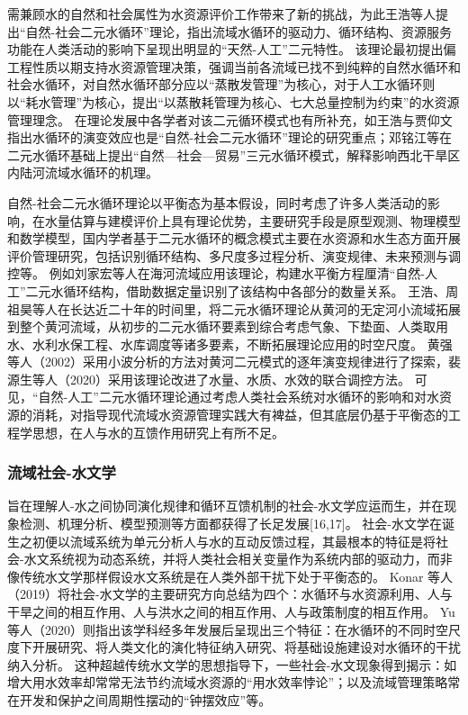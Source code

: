 需兼顾水的自然和社会属性为水资源评价工作带来了新的挑战，为此王浩等人提出“自然-社会二元水循环”理论，指出流域水循环的驱动力、循环结构、资源服务功能在人类活动的影响下呈现出明显的“天然-人工”二元特性\cite{wang2006}。
该理论最初提出偏工程性质以期支持水资源管理决策，强调当前各流域已找不到纯粹的自然水循环和社会水循环，对自然水循环部分应以“蒸散发管理”为核心，对于人工水循环则以“耗水管理”为核心，提出“以蒸散耗管理为核心、七大总量控制为约束”的水资源管理理念\cite{wang2010}。
在理论发展中各学者对该二元循环模式也有所补充，如王浩与贾仰文指出水循环的演变效应也是“自然-社会二元水循环”理论的研究重点\cite{wang2016}；邓铭江等在二元水循环基础上提出“自然—社会—贸易”三元水循环模式，解释影响西北干旱区内陆河流域水循环的机理\cite{deng2020}。

% 
自然-社会二元水循环理论以平衡态为基本假设，同时考虑了许多人类活动的影响，在水量估算与建模评价上具有理论优势，主要研究手段是原型观测、物理模型和数学模型，国内学者基于二元水循环的概念模式主要在水资源和水生态方面开展评价管理研究，包括识别循环结构、多尺度多过程分析、演变规律、未来预测与调控等\cite{wang2016}。
例如刘家宏等人在海河流域应用该理论，构建水平衡方程厘清“自然-人工”二元水循环结构，借助数据定量识别了该结构中各部分的数量关系\cite{liu2010}。
王浩\cite{wang2004}、周祖昊\cite{zhou2022a}等人在长达近二十年的时间里，将二元水循环理论从黄河的无定河小流域拓展到整个黄河流域，从初步的二元水循环要素到综合考虑气象、下垫面、人类取用水、水利水保工程、水库调度等诸多要素，不断拓展理论应用的时空尺度。
黄强等人（2002）采用小波分析的方法对黄河二元模式的逐年演变规律进行了探索\cite{huang2002}，裴源生等人（2020）采用该理论改进了水量、水质、水效的联合调控方法\cite{pei2020}。
可见，“自然-人工”二元水循环理论通过考虑人类社会系统对水循环的影响和对水资源的消耗，对指导现代流域水资源管理实践大有裨益，但其底层仍基于平衡态的工程学思想，在人与水的互馈作用研究上有所不足。

\subsubsection*{流域社会-水文学}

旨在理解人-水之间协同演化规律和循环互馈机制的社会-水文学应运而生，并在现象检测、机理分析、模型预测等方面都获得了长足发展[16,17]。
社会-水文学在诞生之初便以流域系统为单元分析人与水的互动反馈过程，其最根本的特征是将社会-水文系统视为动态系统，并将人类社会相关变量作为系统内部的驱动力，而非像传统水文学那样假设水文系统是在人类外部干扰下处于平衡态的\cite{sivapalan2012}。
Konar 等人（2019）将社会-水文学的主要研究方向总结为四个：水循环与水资源利用、人与干旱之间的相互作用、人与洪水之间的相互作用、人与政策制度的相互作用\cite{konar2019}。
Yu 等人（2020）则指出该学科经多年发展后呈现出三个特征：在水循环的不同时空尺度下开展研究、将人类文化的演化特征纳入研究、将基础设施建设对水循环的干扰纳入分析\cite{yu2020}。
这种超越传统水文学的思想指导下，一些社会-水文现象得到揭示：如增大用水效率却常常无法节约流域水资源的“用水效率悖论”；以及流域管理策略常在开发和保护之间周期性摆动的“钟摆效应”等。 %

